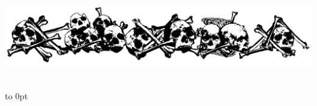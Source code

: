 \vfill

\centerline{\includegraphics[height=1.5in]{art/skulls}}
\vfill\vbox to 0pt{}
\clearpage

\squelchbackground

%


\restorebackground
